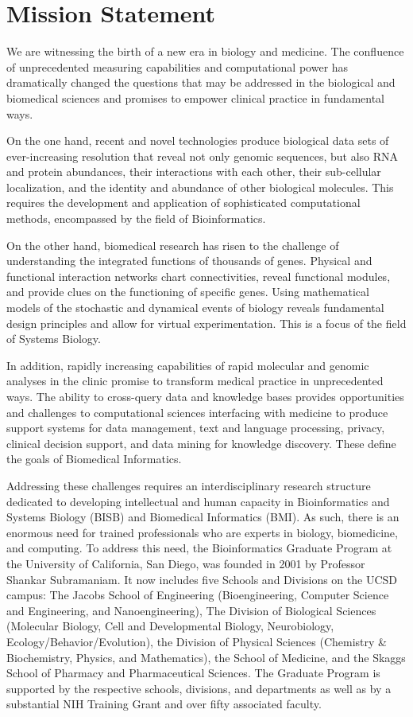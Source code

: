 \chapter{Mission Statement}
We are witnessing the birth of a new era in biology and medicine. The confluence of unprecedented measuring capabilities and computational power has dramatically changed the questions that may be addressed in the biological and biomedical sciences and promises to empower clinical practice in fundamental ways.

On the one hand, recent and novel technologies produce biological data sets of ever-increasing resolution that reveal not only genomic sequences, but also RNA and protein abundances, their interactions with each other, their sub-cellular localization, and the identity and abundance of other biological molecules. This requires the development and application of sophisticated computational methods, encompassed by the field of Bioinformatics.

On the other hand, biomedical research has risen to the challenge of understanding the integrated functions of thousands of genes. Physical and functional interaction networks chart connectivities, reveal functional modules, and provide clues on the functioning of specific genes. Using mathematical models of the stochastic and dynamical events of biology reveals fundamental design principles and allow for virtual experimentation.  This is a focus of the field of Systems Biology.

In addition, rapidly increasing capabilities of rapid molecular and genomic analyses in the clinic promise to transform medical practice in unprecedented ways.  The ability to cross-query data and knowledge bases provides opportunities and challenges to computational sciences interfacing with medicine to produce support systems for data management, text and language processing, privacy, clinical decision support, and data mining for knowledge discovery. These define the goals of Biomedical Informatics.

Addressing these challenges requires an interdisciplinary research structure dedicated to developing intellectual and human capacity in Bioinformatics and Systems Biology (BISB) and Biomedical Informatics (BMI). As such, there is an enormous need for trained professionals who are experts in biology, biomedicine, and computing. To address this need, the Bioinformatics Graduate Program at the University of California, San Diego, was founded in 2001 by Professor Shankar Subramaniam. It now includes five Schools and Divisions on the UCSD campus: The Jacobs School of Engineering (Bioengineering, Computer Science and Engineering, and Nanoengineering), The Division of Biological Sciences (Molecular Biology, Cell and Developmental Biology, Neurobiology, Ecology/Behavior/Evolution), the Division of Physical Sciences (Chemistry \& Biochemistry, Physics, and Mathematics), the School of Medicine, and the Skaggs School of Pharmacy and Pharmaceutical Sciences. The Graduate Program is supported by the respective schools, divisions, and departments as well as by a substantial NIH Training Grant and over fifty associated faculty.